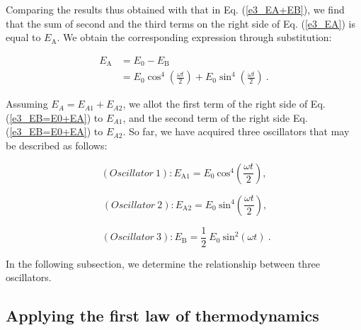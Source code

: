 \documentclass[%
 reprint,
 amsmath,amssymb,
 aps,
]{revtex4-1}
\numberwithin{equation}{section}%
\begin{document}
    Comparing the results thus obtained with that in Eq. (\ref{e3_EA+EB}), we find that the sum of second and the third terms on the right side of Eq. (\ref{e3_EA}) is equal to $E_{\mathrm{A}}$. We obtain the corresponding expression through substitution:

        \begin{equation}
            \begin{split}
                E_{\mathrm{A}}
                    &= E_{0} - E_{\mathrm{B}} \\
                    &= E_{0} \cos^{4}  \left( \frac{\omega t}{2} \right) + E_{0} \sin^{4} \left( \frac{\omega t}{2} \right)
                    \ .
                    \label{e3_EB=E0+EA}
            \end{split}
        \end{equation}

    Assuming $E_{A}=E_{A1}+E_{A2}$, we allot the first term of the right side of Eq. (\ref{e3_EB=E0+EA}) to $E_{A1}$, and the second term of the right side Eq. (\ref{e3_EB=E0+EA}) to $E_{A2}$. So far, we have acquired three oscillators that may be described as follows:

        \begin{equation}
            (Oscillator \ 1): E_{\mathrm{A1}} = E_{0} \ \mathrm{cos}^{4} \left( \frac{\omega t}{2} \right)
            ,
            \label{e3_Osc_1}
        \end{equation}

        \begin{equation}
            \ (Oscillator \ 2): E_{\mathrm{A2}} = E_{0} \ \mathrm{sin}^{4} \left( \frac{\omega t}{2} \right) 
            \label{e3_Osc_2}
            ,
        \end{equation}

        \begin{equation}
            \ \ (Oscillator \ 3): E_{\mathrm{B}} = \frac{1}{2} \ E_{0} \ \mathrm{sin}^{2} (\omega t)
            \ .
            \label{e3_Osc_3}
        \end{equation}

    In the following subsection, we determine the relationship between three oscillators.




\subsection{Applying the first law of thermodynamics}
\label{Applying_the_first_law_of_thermodynamics}    
\end{document}
